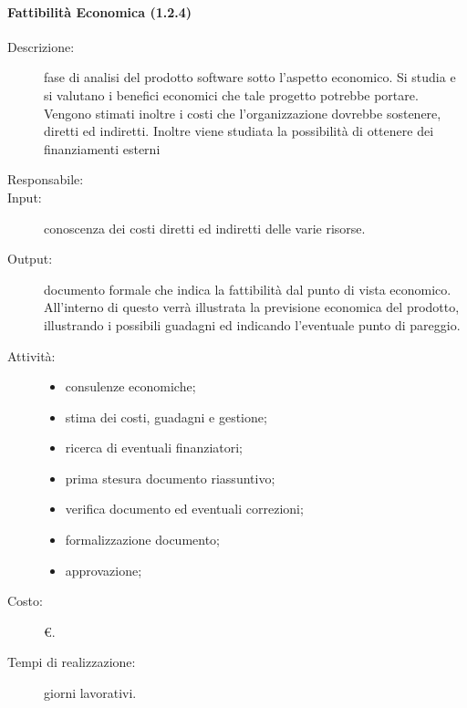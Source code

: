 \paragraph{Fattibilità Economica (1.2.4)}
\begin{description}
\item[Descrizione:] fase di analisi del prodotto software sotto l'aspetto economico. Si studia e si valutano i benefici economici che tale progetto potrebbe portare. Vengono stimati inoltre i costi che l'organizzazione dovrebbe sostenere, diretti ed indiretti. Inoltre viene studiata la possibilità di ottenere dei finanziamenti esterni 
\item[Responsabile:] 
\item[Input:] conoscenza dei costi diretti ed indiretti delle varie risorse.
\item[Output:] documento formale che indica la fattibilità dal punto di vista economico. All'interno di questo verrà illustrata la previsione economica del prodotto, illustrando i possibili guadagni ed indicando l'eventuale punto di pareggio.
\item[Attività:]
\begin{itemize}
\item consulenze economiche;
\item stima dei costi, guadagni e gestione;
\item ricerca di eventuali finanziatori;
\item prima stesura documento riassuntivo;
\item verifica documento ed eventuali correzioni;
\item formalizzazione documento;
\item approvazione;
\end{itemize}
\item[Costo:] \euro.
\item[Tempi di realizzazione:]  giorni lavorativi.
\end{description}

